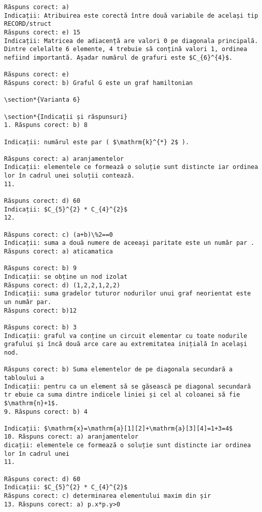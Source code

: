 \begin{verbatim}
Răspuns corect: a)
Indicații: Atribuirea este corectă între două variabile de același tip RECORD/struct
Răspuns corect: e) 15
Indicații: Matricea de adiacență are valori 0 pe diagonala principală. Dintre celelalte 6 elemente, 4 trebuie să conțină valori 1, ordinea nefiind importantă. Așadar numărul de grafuri este $C_{6}^{4}$.

Răspuns corect: e)
Răspuns corect: b) Graful G este un graf hamiltonian

\section*{Varianta 6}

\section*{Indicații și răspunsuri}
1. Răspuns corect: b) 8

Indicații: numărul este par ( $\mathrm{k}^{*} 2$ ).

Răspuns corect: a) aranjamentelor
Indicații: elementele ce formează o soluție sunt distincte iar ordinea lor în cadrul unei soluții contează.
11.

Răspuns corect: d) 60
Indicații: $C_{5}^{2} * C_{4}^{2}$
12.

Răspuns corect: c) (a+b)\%2==0
Indicații: suma a două numere de aceeași paritate este un număr par .
Răspuns corect: a) aticamatica

Răspuns corect: b) 9
Indicații: se obține un nod izolat
Răspuns corect: d) (1,2,2,1,2,2)
Indicații: suma gradelor tuturor nodurilor unui graf neorientat este un număr par.
Răspuns corect: b)12

Răspuns corect: b) 3
Indicații: graful va conține un circuit elementar cu toate nodurile grafului și încă două arce care au extremitatea inițială în același nod.

Răspuns corect: b) Suma elementelor de pe diagonala secundară a tabloului a
Indicații: pentru ca un element să se găsească pe diagonal secundară tr ebuie ca suma dintre indicele liniei și cel al coloanei să fie $\mathrm{n}+1$.
9. Răspuns corect: b) 4

Indicații: $\mathrm{x}=\mathrm{a}[1][2]+\mathrm{a}[3][4]=1+3=4$
10. Răspuns corect: a) aranjamentelor
dicații: elementele ce formează o soluție sunt distincte iar ordinea lor în cadrul unei
11.

Răspuns corect: d) 60
Indicații: $C_{5}^{2} * C_{4}^{2}$
Răspuns corect: c) determinarea elementului maxim din șir
13. Răspuns corect: a) p.x*p.y>0


\end{verbatim}

